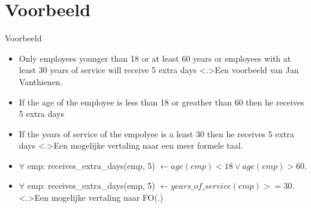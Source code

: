 \documentclass[notes]{beamer}
\newcommand{\seperation}{
	\vspace{1em}
	\ppause
}
\newcommand{\hitem}{
	\ppause
	\item
}
\newcommand{\ppause}{\onslide<+>}
\begin{document}
	\section{Voorbeeld}
	\begin{frame}{Voorbeeld}
		\begin{itemize}
			\hitem Only employees younger than 18 or at least 60 years or employees with at least 30 years of service will receive 5 extra days \cite{VacationDays}
			\note<.>{Een voorbeeld van Jan Vanthienen.}
			
			\seperation
			
			\item If the age of the employee is less than 18 or greather than 60 then he receives 5 extra days
			\item If the years of service of the empolyee is a least 30 then he receives 5 extra days
			\note<.>{Een mogelijke vertaling naar een meer formele taal.}
			
			\seperation
			
			\item $\forall$ emp: receives\_extra\_days(emp, 5)
				$\leftarrow age(emp) < 18 \vee age(emp) > 60$.
			\item $\forall$ emp: receives\_extra\_days(emp, 5)
				$\leftarrow years\_of\_service(emp) >= 30.$
			\note<.>{Een mogelijke vertaling naar FO(.)}
		\end{itemize}
	\end{frame}
\end{document}
